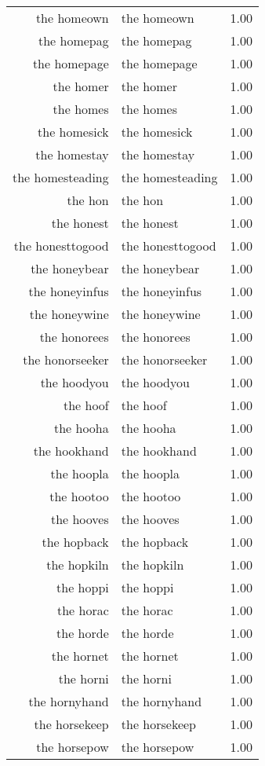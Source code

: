 \begin{table}[ht]
\begin{tabular}{rlr}
  the homeown & the homeown & 1.00 \\ 
  the homepag & the homepag & 1.00 \\ 
  the homepage & the homepage & 1.00 \\ 
  the homer & the homer & 1.00 \\ 
  the homes & the homes & 1.00 \\ 
  the homesick & the homesick & 1.00 \\ 
  the homestay & the homestay & 1.00 \\ 
  the homesteading & the homesteading & 1.00 \\ 
  the hon & the hon & 1.00 \\ 
  the honest & the honest & 1.00 \\ 
  the honesttogood & the honesttogood & 1.00 \\ 
  the honeybear & the honeybear & 1.00 \\ 
  the honeyinfus & the honeyinfus & 1.00 \\ 
  the honeywine & the honeywine & 1.00 \\ 
  the honorees & the honorees & 1.00 \\ 
  the honorseeker & the honorseeker & 1.00 \\ 
  the hoodyou & the hoodyou & 1.00 \\ 
  the hoof & the hoof & 1.00 \\ 
  the hooha & the hooha & 1.00 \\ 
  the hookhand & the hookhand & 1.00 \\ 
  the hoopla & the hoopla & 1.00 \\ 
  the hootoo & the hootoo & 1.00 \\ 
  the hooves & the hooves & 1.00 \\ 
  the hopback & the hopback & 1.00 \\ 
  the hopkiln & the hopkiln & 1.00 \\ 
  the hoppi & the hoppi & 1.00 \\ 
  the horac & the horac & 1.00 \\ 
  the horde & the horde & 1.00 \\ 
  the hornet & the hornet & 1.00 \\ 
  the horni & the horni & 1.00 \\ 
  the hornyhand & the hornyhand & 1.00 \\ 
  the horsekeep & the horsekeep & 1.00 \\ 
  the horsepow & the horsepow & 1.00 \\ 

\end{tabular}
\end{table}
